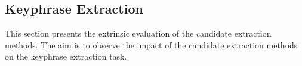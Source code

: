 
  \subsection{Keyphrase Extraction}
  \label{subsec:keyphrase_extraction}
    This section presents the extrinsic evaluation of the candidate extraction
    methods. The aim is to observe the impact of the candidate extraction
    methods on the keyphrase extraction task.

